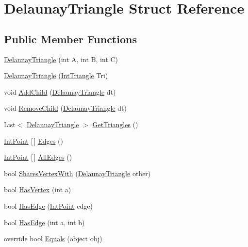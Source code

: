 \hypertarget{struct_delaunay_triangle}{}\section{Delaunay\+Triangle Struct Reference}
\label{struct_delaunay_triangle}
\subsection*{Public Member Functions}
\begin{DoxyCompactItemize}
\item 
\mbox{\hyperlink{struct_delaunay_triangle_a3346e0ff1d4d37b31293359750e28548}{Delaunay\+Triangle}} (int A, int B, int C)
\item 
\mbox{\hyperlink{struct_delaunay_triangle_a98d84cc9db0152ca7bd5e7181a54382e}{Delaunay\+Triangle}} (\mbox{\hyperlink{struct_int_triangle}{Int\+Triangle}} Tri)
\item 
void \mbox{\hyperlink{struct_delaunay_triangle_aa47e1ddfbb465eb5b0f7de2a356b2ae1}{Add\+Child}} (\mbox{\hyperlink{struct_delaunay_triangle}{Delaunay\+Triangle}} dt)
\item 
void \mbox{\hyperlink{struct_delaunay_triangle_ae8eabb4164875b524a4d826a829bcb05}{Remove\+Child}} (\mbox{\hyperlink{struct_delaunay_triangle}{Delaunay\+Triangle}} dt)
\item 
List$<$ \mbox{\hyperlink{struct_delaunay_triangle}{Delaunay\+Triangle}} $>$ \mbox{\hyperlink{struct_delaunay_triangle_a380da11f8b29fd534ea8ce959364f7f7}{Get\+Triangles}} ()
\item 
\mbox{\hyperlink{struct_int_point}{Int\+Point}} \mbox{[}$\,$\mbox{]} \mbox{\hyperlink{struct_delaunay_triangle_af41ef86382b370cdacbb76fff23b3f6d}{Edges}} ()
\item 
\mbox{\hyperlink{struct_int_point}{Int\+Point}} \mbox{[}$\,$\mbox{]} \mbox{\hyperlink{struct_delaunay_triangle_abfa19827eec8c68badc78c4a9b76e21f}{All\+Edges}} ()
\item 
bool \mbox{\hyperlink{struct_delaunay_triangle_a0b4b4356bd164b7b209074203cf9d666}{Shares\+Vertex\+With}} (\mbox{\hyperlink{struct_delaunay_triangle}{Delaunay\+Triangle}} other)
\item 
bool \mbox{\hyperlink{struct_delaunay_triangle_a5797e4a4cf0ec654433e2d61e5540058}{Has\+Vertex}} (int a)
\item 
bool \mbox{\hyperlink{struct_delaunay_triangle_a5faf014731e3078f4989f56f46ce2845}{Has\+Edge}} (\mbox{\hyperlink{struct_int_point}{Int\+Point}} edge)
\item 
bool \mbox{\hyperlink{struct_delaunay_triangle_afbf1696692f10be76c4d701aa2c918f0}{Has\+Edge}} (int a, int b)
\item 
override bool \mbox{\hyperlink{struct_delaunay_triangle_a32169a31c41b6f4f2a223a7dfdbf4b08}{Equals}} (object obj)
\end{DoxyCompactItemize}
